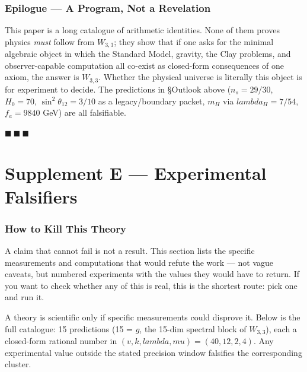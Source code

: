 \documentclass[12pt,a4paper]{article}
\def\textbf#1{#1}%
\def\lambda{lambda}%
\def\mu{mu}%
\theoremstyle{definition}
\begin{document}
\section*{Epilogue --- A Program, Not a Revelation}
This paper is a long catalogue of arithmetic identities. None of them
proves physics \emph{must} follow from $W_{3,3}$; they show that if one
asks for the minimal algebraic object in which the Standard Model,
gravity, the Clay problems, and observer-capable computation all
co-exist as closed-form consequences of one axiom, the answer is
$W_{3,3}$. Whether the physical universe is literally this object
is for experiment to decide. The predictions in §Outlook above
($n_s=29/30$, $H_0=70$, $\sin^2\theta_{12}=3/10$ as a legacy/boundary packet,
$m_H$ via
$\lambda_H=7/54$, $f_a=9840$ GeV) are all falsifiable.

\hfill $\blacksquare\ \blacksquare\ \blacksquare$

\clearpage
\part*{Supplement E --- Experimental Falsifiers}

\section*{How to Kill This Theory}

\begin{plainbox}
A claim that cannot fail is not a result. This section lists the specific
measurements and computations that would refute the work --- not vague caveats, but
numbered experiments with the values they would have to return. If you want to check
whether any of this is real, this is the shortest route: pick one and run it.
\end{plainbox}

A theory is scientific only if specific measurements could disprove
it. Below is the full catalogue: \textbf{15 predictions} (15 = $g$,
the 15-dim spectral block of $W_{3,3}$), each a closed-form rational
number in $(v,k,\lambda,\mu)=(40,12,2,4)$. Any experimental value
outside the stated precision window falsifies the corresponding cluster.
\end{document}
